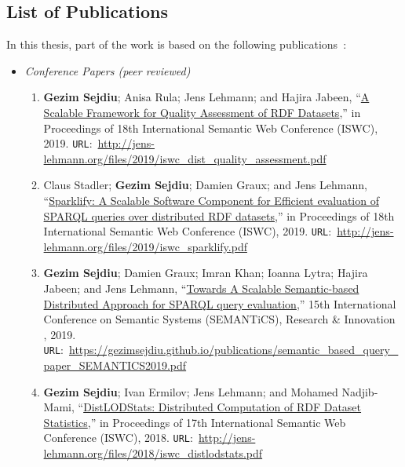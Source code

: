 \subsection{List of Publications}
In this thesis, part of the work is based on the following publications~\cite{sejdiu-2019-sansa-dist-quality-assessment-iswc, 2019-sansa-sparklify-iswc, sejdiu-2019-sansa-semantic-based-semantics, sejdiu-2018-dist-lod-stats-iswc, lehmann-2017-sansa-iswc, Auer+ICWE-2017, sansa-sparklify-ISWC-demo, sansa-hubs-and-authorities-transaction-semantics19-poster, piping-clustering-eswc19-poster, sejdiu-2018-statisfy-iswc-poster, graux-2018-sansa-ethereum-semantics-poster, iermilov-2017-sansa-iswc-demo}:
\begin{itemize}
\item \emph{Conference Papers (peer reviewed)}
\begin{enumerate}
    
    \item \textbf{Gezim Sejdiu}; Anisa Rula; Jens Lehmann; and Hajira Jabeen, “\href{http://jens-lehmann.org/files/2019/iswc_dist_quality_assessment.pdf}{A Scalable Framework for Quality Assessment of RDF Datasets},” in Proceedings of 18th International Semantic Web Conference (ISWC), 2019. \texttt{URL}:~\url{http://jens-lehmann.org/files/2019/iswc_dist_quality_assessment.pdf}

    \item Claus Stadler; \textbf{Gezim Sejdiu}; Damien Graux; and Jens Lehmann, “\href{http://jens-lehmann.org/files/2019/iswc_sparklify.pdf}{Sparklify: A Scalable Software Component for Efficient evaluation of SPARQL queries over distributed RDF datasets},” in Proceedings of 18th International Semantic Web Conference (ISWC), 2019. \texttt{URL}:~\url{http://jens-lehmann.org/files/2019/iswc_sparklify.pdf}

    \item \textbf{Gezim Sejdiu}; Damien Graux; Imran Khan; Ioanna Lytra; Hajira Jabeen; and Jens Lehmann, “\href{https://gezimsejdiu.github.io/publications/semantic_based_query_paper_SEMANTICS2019.pdf}{Towards A Scalable Semantic-based Distributed Approach for SPARQL query evaluation},” 15th International Conference on Semantic Systems (SEMANTiCS), Research \& Innovation , 2019. \texttt{URL}:~\url{https://gezimsejdiu.github.io/publications/semantic_based_query_paper_SEMANTICS2019.pdf}

    \item \textbf{Gezim Sejdiu}; Ivan Ermilov; Jens Lehmann; and Mohamed Nadjib-Mami, “\href{http://jens-lehmann.org/files/2018/iswc_distlodstats.pdf}{DistLODStats: Distributed Computation of RDF Dataset Statistics},” in Proceedings of 17th International Semantic Web Conference (ISWC), 2018. \texttt{URL}:~\url{http://jens-lehmann.org/files/2018/iswc_distlodstats.pdf}


\end{enumerate}
\end{itemize}
